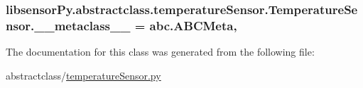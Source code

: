 \subsubsection[{\+\_\+\+\_\+metaclass\+\_\+\+\_\+}]{\setlength{\rightskip}{0pt plus 5cm}libsensor\+Py.\+abstractclass.\+temperature\+Sensor.\+Temperature\+Sensor.\+\_\+\+\_\+metaclass\+\_\+\+\_\+ = abc.\+A\+B\+C\+Meta\hspace{0.3cm}{\ttfamily [static]}, {\ttfamily [private]}}\label{classlibsensorPy_1_1abstractclass_1_1temperatureSensor_1_1TemperatureSensor_afd00f07a78a3cbcf47c9f4cad33c7935}


The documentation for this class was generated from the following file\+:\begin{DoxyCompactItemize}
\item 
abstractclass/\hyperlink{abstractclass_2temperatureSensor_8py}{temperature\+Sensor.\+py}\end{DoxyCompactItemize}
